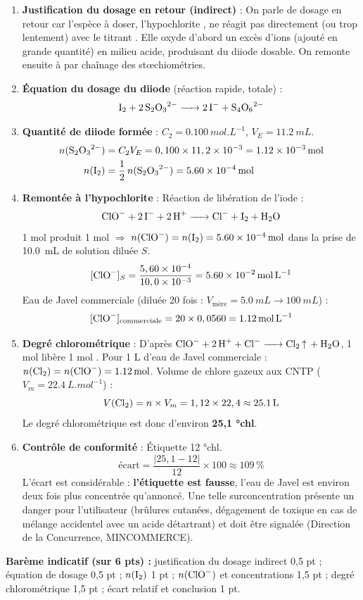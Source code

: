 \documentclass[11pt]{article}
\newcommand{\cle}[1]{{\popxbold\color{popdark}#1}}
\begin{document}
\begin{corrige}
\begin{enumerate}
\item \textbf{Justification du dosage en retour (indirect)} : On parle de \cle{dosage en retour} car l'espèce à doser, l'hypochlorite , ne réagit pas directement (ou trop lentement) avec le titrant . Elle oxyde d'abord un excès d'ions  (ajouté en grande quantité) en milieu acide, produisant du diiode  dosable. On remonte ensuite à  par chaînage des stœchiométries.
\item \textbf{Équation du dosage du diiode} (réaction rapide, totale) :
\[ \ce{I2 + 2S2O3^2- -> 2I- + S4O6^2-} \]
\item \textbf{Quantité de diiode formée} : $C_2 = \SI{0,100}{mol.L^{-1}}$, $V_E = \SI{11,2}{mL}$.
\begin{align*}
n(\ce{S2O3^2-}) &= C_2 V_E = 0,100 \times 11,2\times10^{-3} = \SI{1,12e-3}{mol} \\
n(\ce{I2}) &= \frac{1}{2}\,n(\ce{S2O3^2-}) = \SI{5,60e-4}{mol}
\end{align*}
\item \textbf{Remontée à l'hypochlorite} : Réaction de libération de l'iode :
\[ \ce{ClO- + 2I- + 2H+ -> Cl- + I2 + H2O} \]
1 mol  produit 1 mol  $\Rightarrow$ $n(\ce{ClO-}) = n(\ce{I2}) = \SI{5,60e-4}{mol}$ dans la prise de \SI{10,0}{mL} de solution diluée $S$.
\[ [\ce{ClO-}]_S = \frac{5,60\times10^{-4}}{10,0\times10^{-3}} = \SI{5,60e-2}{mol.L^{-1}} \]
Eau de Javel commerciale (diluée 20 fois : $V_{\text{mère}} = \SI{5,0}{mL} \rightarrow \SI{100}{mL}$) :
\[ [\ce{ClO-}]_{\text{commerciale}} = 20 \times 0,0560 = \SI{1,12}{mol.L^{-1}} \]
\item \textbf{Degré chlorométrique} : D'après $\ce{ClO- + 2H+ + Cl- -> Cl2 ^ + H2O}$, 1 mol  libère 1 mol .
Pour 1 L d'eau de Javel commerciale : $n(\ce{Cl2}) = n(\ce{ClO-}) = \SI{1,12}{mol}$.
Volume de chlore gazeux aux CNTP ($V_m = \SI{22,4}{L.mol^{-1}}$) :
\[ V(\ce{Cl2}) = n \times V_m = 1,12 \times 22,4 \approx \SI{25,1}{L} \]
Le degré chlorométrique est donc d'environ \textbf{25,1 °chl}.
\item \textbf{Contrôle de conformité} : Étiquette 12 °chl.
\[ \text{écart} = \frac{|25,1 - 12|}{12} \times 100 \approx 109\,\% \]
L'écart est considérable : \textbf{l'étiquette est fausse}, l'eau de Javel est environ deux fois plus concentrée qu'annoncé. Une telle surconcentration présente un danger pour l'utilisateur (brûlures cutanées, dégagement de  toxique en cas de mélange accidentel avec un acide détartrant) et doit être signalée (Direction de la Concurrence, MINCOMMERCE).
\end{enumerate}
\textbf{Barème indicatif (sur 6 pts) :} justification du dosage indirect 0,5 pt ; équation de dosage 0,5 pt ; $n(\ce{I2})$ 1 pt ; $n(\ce{ClO-})$ et concentrations 1,5 pt ; degré chlorométrique 1,5 pt ; écart relatif et conclusion 1 pt.


\end{corrige}
\end{document}
